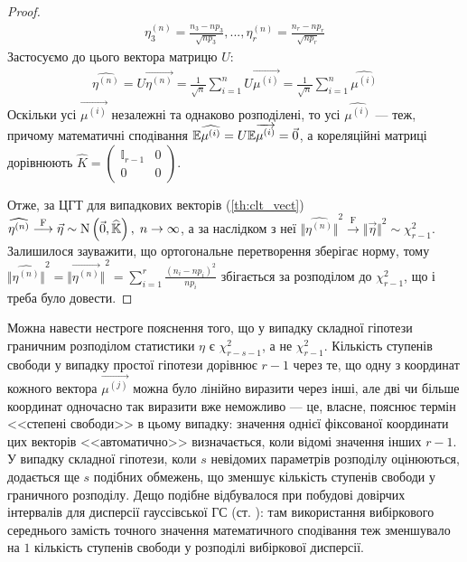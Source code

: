 \begin{proof}
\begin{gather*}
        {\eta^{(n)}_3} = \frac{n_3 - n p_3}{\sqrt{n p_3}}, ..., 
        {\eta^{(n)}_r} = \frac{n_r - n p_r}{\sqrt{n p_r}}
    \end{gather*}
    Застосуємо до цього вектора матрицю $U$:
    \begin{gather*}
        \widehat{\eta^{(n)}} = U \overrightarrow{\eta^{(n)}} = \frac{1}{\sqrt{n}}
        \sum\limits_{i=1}^n U \overrightarrow{\mu^{(i)}} = 
        \frac{1}{\sqrt{n}} \sum\limits_{i=1}^n \widehat{\mu^{(i)}}
    \end{gather*}
    Оскільки усі $\overrightarrow{\mu^{(i)}}$ незалежні та однаково розподілені, то усі $\widehat{\mu^{(i)}}$ --- теж, причому
    математичні сподівання $\mathbb{E} \widehat{\mu^{(i)}} = U \mathbb{E} \overrightarrow{\mu^{(i)}} = \vec{0}$,
    а кореляційні матриці дорівнюють $\widehat{K} = \begin{pmatrix}
        \mathbb{I}_{r-1} & 0 \\
        0 & 0 
    \end{pmatrix}$.

    Отже, за ЦГТ для випадкових векторів (\ref{th:clt_vect})
    $\widehat{\eta^{(n)}} \overset{\mathrm{F}}{\longrightarrow} \vec{\eta} \sim \mathrm{N}\left(\vec{0}, \widehat{\mathbb{K}}\right), \; n\to\infty$, 
    а за наслідком з неї
    ${\Big\Vert \widehat{\eta^{(n)}}\Big\Vert}^2 \overset{\mathrm{F}}{\longrightarrow} {\Vert \vec{\eta} \Vert}^2 \sim \chi^2_{r-1}$.
    Залишилося зауважити, що ортогональне перетворення зберігає норму, тому
    $
        {\Big\Vert \widehat{\eta^{(n)}}\Big\Vert}^2 = {\Big\Vert \overrightarrow{\eta^{(n)}}\Big\Vert}^2 = 
        \sum\limits_{i=1}^r \frac{\left(n_i - n p_i\right)^2}{n p_i}
    $ збігається за розподілом до $\chi^2_{r-1}$, що і треба було довести.
\end{proof}

\begin{remark}
    Можна навести нестроге пояснення того, що у випадку складної гіпотези граничним розподілом статистики $\eta$
    є $\chi^2_{r-s-1}$, а не $\chi^2_{r-1}$. Кількість ступенів свободи у випадку простої гіпотези дорівнює $r-1$
    через те, що одну з координат кожного вектора $\overrightarrow{\mu^{(j)}}$ можна було лінійно виразити через інші, але дві чи більше
    координат одночасно так виразити вже неможливо --- це, власне, пояснює термін <<степені свободи>> в цьому випадку: значення однієї фіксованої координати
    цих векторів <<автоматично>> визначається, коли відомі значення інших $r-1$. У випадку складної гіпотези, коли $s$ невідомих параметрів розподілу оцінюються,
    додається ще $s$ подібних обмежень, що зменшує кількість ступенів свободи у граничного розподілу. Дещо подібне відбувалося при побудові довірчих інтервалів
    для дисперсії гауссівської ГС (ст. \pageref{normal_variance_conf_interv}): там використання вибіркового середнього замість точного значення математичного сподівання
    теж зменшувало на $1$ кількість ступенів свободи у розподілі вибіркової дисперсії.
\end{remark}

